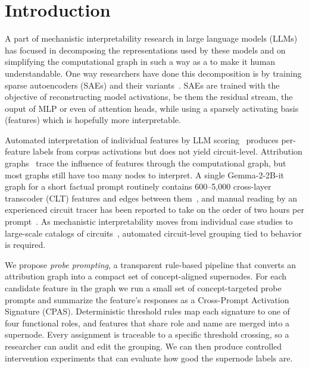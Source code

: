 \section{Introduction}
\label{sec:intro}

A part of mechanistic interpretability research in large language models (LLMs) has focused in decomposing the representations used by these models and on simplifying the computational graph in such a way as a to make it human understandable. One way researchers have done this decomposition is by training sparse autoencoders (SAEs) and their variants~\cite{bricken2023monosemanticity,templeton2024scaling,crosscoders2024,marks2024dictionary}. SAEs are trained with the objective of reconstructing model activations, be them the residual stream, the ouput of MLP or even of attention heads, while using a sparsely activating basis (features) which is hopefully more interpretable.

Automated interpretation of individual features by LLM scoring~\cite{bills2023autointerp,paulo2024autointerp,templeton2024scaling} produces per-feature labels from corpus activations but does not yield circuit-level. Attribution graphs~\cite{ameisen2025circuittracing,lindsey2025biology} trace the influence of features through the computational graph, but most graphs still have too many nodes to interpret. A single Gemma-2-2B-it graph for a short factual prompt routinely contains 600--5{,}000 cross-layer transcoder (CLT) features and edges between them~\cite{ameisen2025circuittracing,lindsey2025biology}, and manual reading by an experienced circuit tracer has been reported to take on the order of two hours per prompt~\cite{neuronpedia2025podcast}. As mechanistic interpretability moves from individual case studies to large-scale catalogs of circuits~\cite{hannaameisen2026planning,marks2024dictionary}, automated circuit-level grouping tied to behavior is required.

We propose \emph{probe prompting}, a transparent rule-based pipeline that converts an attribution graph into a compact set of concept-aligned supernodes. For each candidate feature in the graph we run a small set of concept-targeted probe prompts and summarize the feature's responses as a Cross-Prompt Activation Signature (CPAS). Deterministic threshold rules map each signature to one of four functional roles, and features that share role and name are merged into a supernode. Every assignment is traceable to a specific threshold crossing, so a researcher can audit and edit the grouping. We can then produce controlled intervention experiments that can evaluate how good the supernode labels are.


